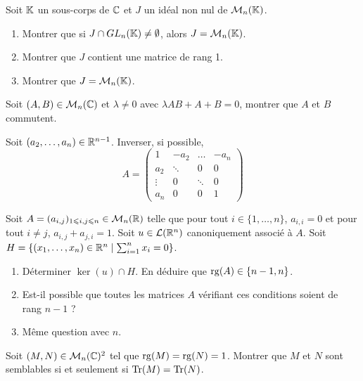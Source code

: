 \begin{exercise}
	Soit $\mathbb{K}$ un sous-corps de $\mathbb{C}$ et $J$ un idéal non nul de $\mathcal{M}_{n}(\mathbb{K})$.
	\begin{enumerate}
		\item
		Montrer que si $J\cap GL_{n}(\mathbb{K})\neq\emptyset$, alors $J=\mathcal{M}_{n}(\mathbb{K})$.
		\item
		Montrer que $J$ contient une matrice de rang 1.
		\item
		Montrer que $J=\mathcal{M}_{n}(\mathbb{K})$.
	\end{enumerate}
\end{exercise}

\begin{exercise}
	Soit $(A,B)\in\mathcal{M}_{n}(\mathbb{C})$ et $\lambda\neq 0$ avec $\lambda AB+A+B=0$, montrer
	que $A$ et $B$ commutent.
\end{exercise}

\begin{exercise}
	Soit $(a_{2},\dots,a_{n})\in\mathbb{R}^{n-1}$. Inverser, si possible,
	$$
	A=
	\begin{pmatrix}
		1 		& -a_{2}	& \dots		& -a_{n}\\
		a_{2} 	& \ddots 	& 0			& 0\\
		\vdots 	& 0			& \ddots 	& 0\\
		a_{n}	& 0			& 0			& 1
	\end{pmatrix}
	$$
\end{exercise}

\begin{exercise}
	Soit $A=(a_{i,j})_{1\leqslant i,j\leqslant n}\in\mathcal{M}_{n}(\mathbb{R})$ telle que pour
	tout $i\in\{1,\dots,n\}$, $a_{i,i}=0$ et pour tout $i\neq j$,
	$a_{i,j}+a_{j,i}=1$. Soit $u\in\mathcal{L}(\mathbb{R}^{n})$ canoniquement associé à $A$. Soit
	$H=\{(x_{1},\dots,x_{n})\in\mathbb{R}^{n}\mid\sum_{i=1}^{n}x_{i}=0\}$.
	\begin{enumerate}
		\item
		Déterminer $\ker(u)\cap H$. En déduire que $\operatorname{rg}(A)\in\{n-1,n\}$.
		\item
		Est-il possible que toutes les matrices $A$ vérifiant ces conditions
		soient de rang $n-1$ ?
		\item
		Même question avec $n$.
	\end{enumerate}
\end{exercise}

\begin{exercise}
	Soit $(M,N)\in\mathcal{M}_{n}(\mathbb{C})^{2}$ tel que $\operatorname{rg}(M)=\operatorname{rg}(N)=1$. Montrer que $M$ et
	$N$ sont semblables si et seulement si $\operatorname{Tr}(M)=\operatorname{Tr}(N)$.
\end{exercise}

